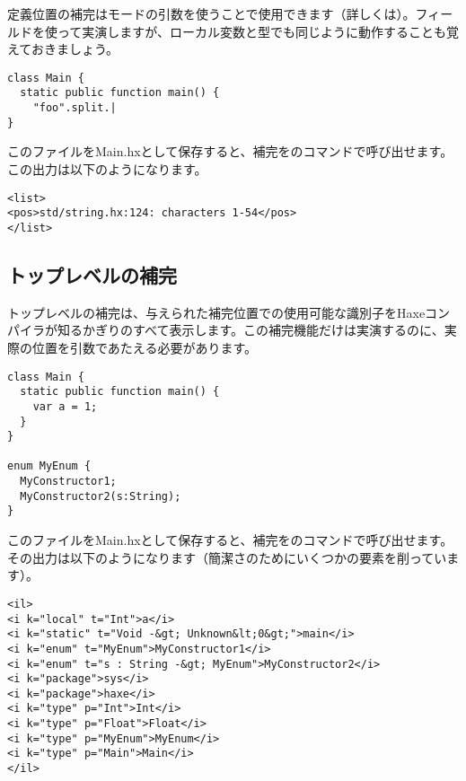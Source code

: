 定義位置の補完はモードの引数を使うことで使用できます（詳しくは）。フィールドを使って実演しますが、ローカル変数と型でも同じように動作することも覚えておきましょう。

\begin{lstlisting}
class Main {
  static public function main() {
    "foo".split.|
}
\end{lstlisting}

このファイルをMain.hxとして保存すると、補完をのコマンドで呼び出せます。この出力は以下のようになります。

\begin{lstlisting}
<list>
<pos>std/string.hx:124: characters 1-54</pos>
</list>
\end{lstlisting}


\subsection{トップレベルの補完}
\label{cr-completion-top-level}

トップレベルの補完は、与えられた補完位置での使用可能な識別子をHaxeコンパイラが知るかぎりのすべて表示します。この補完機能だけは実演するのに、実際の位置を引数であたえる必要があります。

\begin{lstlisting}
class Main {
  static public function main() {
    var a = 1;
  }
}

enum MyEnum {
  MyConstructor1;
  MyConstructor2(s:String);
}
\end{lstlisting}

このファイルをMain.hxとして保存すると、補完をのコマンドで呼び出せます。その出力は以下のようになります（簡潔さのためにいくつかの要素を削っています）。

\begin{lstlisting}
<il>
<i k="local" t="Int">a</i>
<i k="static" t="Void -&gt; Unknown&lt;0&gt;">main</i>
<i k="enum" t="MyEnum">MyConstructor1</i>
<i k="enum" t="s : String -&gt; MyEnum">MyConstructor2</i>
<i k="package">sys</i>
<i k="package">haxe</i>
<i k="type" p="Int">Int</i>
<i k="type" p="Float">Float</i>
<i k="type" p="MyEnum">MyEnum</i>
<i k="type" p="Main">Main</i>
</il>
\end{lstlisting}

